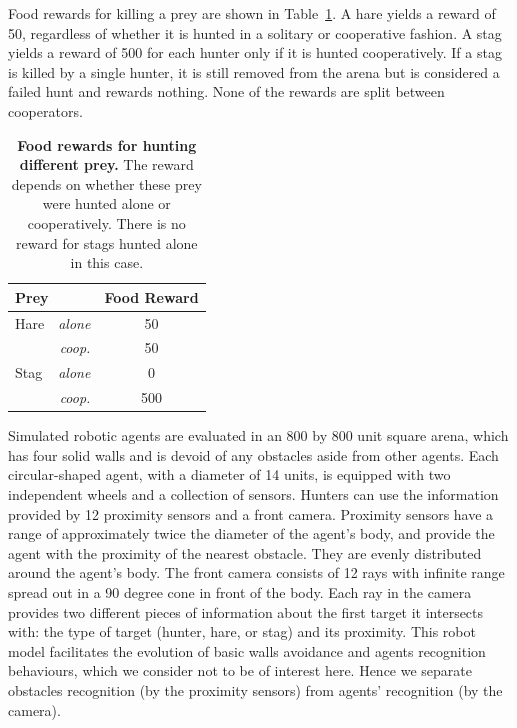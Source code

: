     Food rewards for killing a prey are shown in Table~\ref{table:tableRewardsInitial}. A hare yields a reward of 50, regardless of whether it is hunted in a solitary or cooperative fashion. A stag yields a reward of 500 for each hunter only if it is hunted cooperatively. If a stag is killed by a single hunter, it is still removed from the arena but is considered a failed hunt and rewards nothing. None of the rewards are split between cooperators.

    \begin{table}[ht]
      \centering
        \begin{tabular}{|l|r|c|}
          \hline
          \multicolumn{2}{|l|}{\textbf{Prey}} & \textbf{Food Reward} \\
          \hline
          Hare & \textit{alone} & 50 \\
          \hline
          & \textit{coop.} & 50 \\
          \hline
          Stag & \textit{alone} & 0 \\
          \hline
          & \textit{coop.} & 500 \\
          \hline
        \end{tabular}
        \caption{\textbf{Food rewards for hunting different prey.}
        The reward depends on whether these prey were hunted alone or cooperatively. There is no reward for stags hunted alone in this case.}
      \label{table:tableRewardsInitial}
    \end{table}

    Simulated robotic agents are evaluated in an 800 by 800 unit square arena, which has four solid walls and is devoid of any obstacles aside from other agents. Each circular-shaped agent, with a diameter of 14 units, is equipped with two independent wheels and a collection of sensors. Hunters can use the information provided by 12 proximity sensors and a front camera. Proximity sensors have a range of approximately twice the diameter of the agent's body, and provide the agent with the proximity of the nearest obstacle. They are evenly distributed around the agent's body. The front camera consists of 12 rays with infinite range spread out in a 90 degree cone in front of the body. Each ray in the camera provides two different pieces of information about the first target it intersects with: the type of target (hunter, hare, or stag) and its proximity. This robot model facilitates the evolution of basic walls avoidance and agents recognition behaviours, which we consider not to be of interest here. Hence we separate obstacles recognition (by the proximity sensors) from agents' recognition (by the camera).

